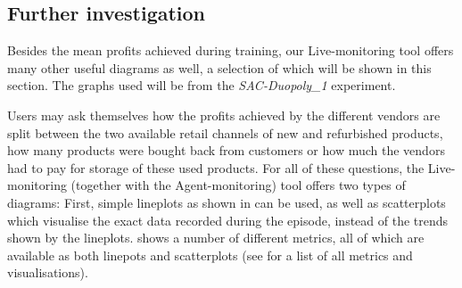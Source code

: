 \subsection{Further investigation}

Besides the mean profits achieved during training, our Live-monitoring tool offers many other useful diagrams as well, a selection of which will be shown in this section. The graphs used will be from the \emph{SAC-Duopoly\_1} experiment.

Users may ask themselves how the profits achieved by the different vendors are split between the two available retail channels of new and refurbished products, how many products were bought back from customers or how much the vendors had to pay for storage of these used products. For all of these questions, the Live-monitoring (together with the Agent-monitoring) tool offers two types of diagrams: First, simple lineplots as shown in  can be used, as well as scatterplots which visualise the exact data recorded during the episode, instead of the trends shown by the lineplots.  shows a number of different metrics, all of which are available as both linepots and scatterplots (see  for a list of all metrics and visualisations).


